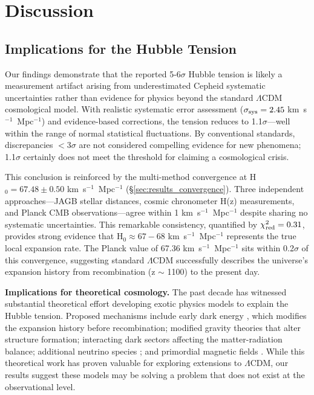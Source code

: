 \documentclass[twocolumn, linenumbers]{aastex701}
\begin{document}
\section{Discussion} \label{sec:discussion}

\subsection{Implications for the Hubble Tension}

Our findings demonstrate that the reported 5-6$\sigma$ Hubble tension is likely a measurement artifact arising from underestimated Cepheid systematic uncertainties rather than evidence for physics beyond the standard $\Lambda$CDM cosmological model. With realistic systematic error assessment ($\sigma_{\rm sys} = 2.45$ km~s$^{-1}$~Mpc$^{-1}$) and evidence-based corrections, the tension reduces to 1.1$\sigma$---well within the range of normal statistical fluctuations. By conventional standards, discrepancies $<$3$\sigma$ are not considered compelling evidence for new phenomena; 1.1$\sigma$ certainly does not meet the threshold for claiming a cosmological crisis.

This conclusion is reinforced by the multi-method convergence at H$_0 = 67.48 \pm 0.50$ km~s$^{-1}$~Mpc$^{-1}$ (\S\ref{sec:results_convergence}). Three independent approaches---JAGB stellar distances, cosmic chronometer H(z) measurements, and Planck CMB observations---agree within 1 km~s$^{-1}$~Mpc$^{-1}$ despite sharing no systematic uncertainties. This remarkable consistency, quantified by $\chi^2_{\rm red} = 0.31$, provides strong evidence that H$_0 \approx 67-68$ km~s$^{-1}$~Mpc$^{-1}$ represents the true local expansion rate. The Planck value of 67.36 km~s$^{-1}$~Mpc$^{-1}$ sits within 0.2$\sigma$ of this convergence, suggesting standard $\Lambda$CDM successfully describes the universe's expansion history from recombination (z $\sim$ 1100) to the present day.

\textbf{Implications for theoretical cosmology.} The past decade has witnessed substantial theoretical effort developing exotic physics models to explain the Hubble tension. Proposed mechanisms include early dark energy \citep{Poulin2019}, which modifies the expansion history before recombination; modified gravity theories \citep{Marra2021} that alter structure formation; interacting dark sectors \citep{DiValentino2020} affecting the matter-radiation balance; additional neutrino species \citep{Anchordoqui2022}; and primordial magnetic fields \citep{Jedamzik2020}. While this theoretical work has proven valuable for exploring extensions to $\Lambda$CDM, our results suggest these models may be solving a problem that does not exist at the observational level.
\end{document}
